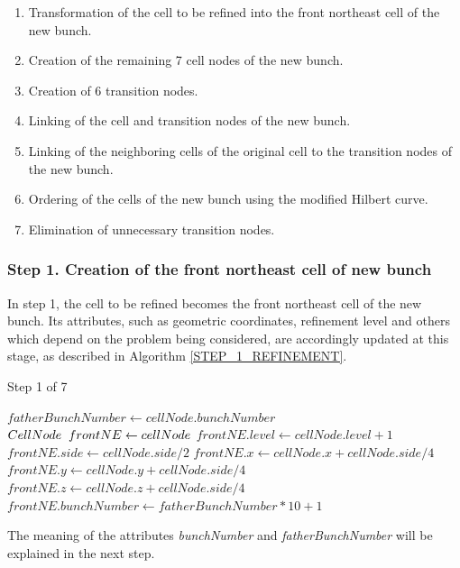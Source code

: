 \begin{enumerate}
 \item Transformation of the cell to be refined into the front northeast cell of the new
 bunch.
 \item Creation of the remaining 7 cell nodes of the new bunch.
 \item Creation of 6 transition nodes.
 \item Linking of the cell and transition nodes of the new bunch.
 \item Linking of the neighboring cells of the original cell to the transition nodes of the new
 bunch.
 \item Ordering of the cells of the new bunch using the modified
 Hilbert curve.
 \item Elimination of unnecessary transition nodes.
\end{enumerate}

\subsubsection*{Step 1. Creation of the front northeast cell of new bunch}
In step 1, the cell to be refined becomes the front northeast cell
of the new bunch. Its attributes, such as geometric coordinates,
refinement level and others which depend on the problem being
considered, are accordingly updated at this stage, as described in
Algorithm \ref{STEP_1_REFINEMENT}.

\begin{algorithm}
    \caption{Step 1 of 7}
    \small{
    \begin{algorithmic}[1]
        \State $fatherBunchNumber \gets cellNode.bunchNumber$
        \State $CellNode \hspace{2mm} frontNE \gets cellNode$
        \State $frontNE.level \gets cellNode.level + 1$
        \State $frontNE.side \gets cellNode.side / 2$
        \State $frontNE.x \gets cellNode.x + cellNode.side / 4$
        \State $frontNE.y \gets cellNode.y + cellNode.side / 4$
        \State $frontNE.z \gets cellNode.z + cellNode.side / 4$
        \State $frontNE.bunchNumber \gets fatherBunchNumber*10 + 1$
    \end{algorithmic}
    }
    \label{STEP_1_REFINEMENT}
\end{algorithm}
\noindent The meaning of the attributes \textit{bunchNumber} and
\textit{fatherBunchNumber} will be explained in the next step.

